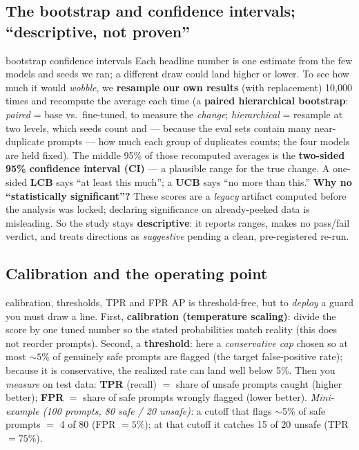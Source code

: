 \documentclass[11pt]{article}
\begin{document}
\subsection{The bootstrap and confidence intervals; ``descriptive, not proven''}
\label{subsec:boot}
\begin{background}{bootstrap confidence intervals}
\small
Each headline number is one estimate from the few models and seeds we ran; a different draw
could land higher or lower. To see how much it would \emph{wobble}, we \textbf{resample our own
results} (with replacement) 10{,}000 times and recompute the average each time (a
\textbf{paired hierarchical bootstrap}: \emph{paired} = base vs.\ fine-tuned, to measure the
\emph{change}; \emph{hierarchical} = resample at two levels, which seeds count and --- because
the eval sets contain many near-duplicate prompts --- how much each group of duplicates
counts; the four models are held fixed). The middle 95\% of those recomputed averages is the
\textbf{two-sided 95\% confidence interval (CI)} --- a plausible range for the true change. A
one-sided \textbf{LCB} says ``at least this much''; a \textbf{UCB} says ``no more than this.''
\textbf{Why no ``statistically significant''?} These scores are a \emph{legacy} artifact
computed before the analysis was locked; declaring significance on already-peeked data is
misleading. So the study stays \textbf{descriptive}: it reports ranges, makes no pass/fail
verdict, and treats directions as \emph{suggestive} pending a clean, pre-registered re-run.
\end{background}

\subsection{Calibration and the operating point}
\label{subsec:calib}
\begin{background}{calibration, thresholds, TPR and FPR}
\small
AP is threshold-free, but to \emph{deploy} a guard you must draw a line. First,
\textbf{calibration (temperature scaling)}: divide the score by one tuned number so the stated
probabilities match reality (this does not reorder prompts). Second, a \textbf{threshold}:
here a \emph{conservative cap} chosen so at most ${\sim}5\%$ of genuinely safe prompts are
flagged (the target false-positive rate); because it is conservative, the realized rate can
land well below 5\%. Then you \emph{measure} on test data: \textbf{TPR} (recall) $=$ share of
unsafe prompts caught (higher better); \textbf{FPR} $=$ share of safe prompts wrongly flagged
(lower better). \emph{Mini-example (100 prompts, 80 safe / 20 unsafe):} a cutoff that flags
$\sim$5\% of safe prompts $=$ 4 of 80 (FPR $=5\%$); at that cutoff it catches 15 of 20 unsafe
(TPR $=75\%$).
\end{background}
\end{document}
